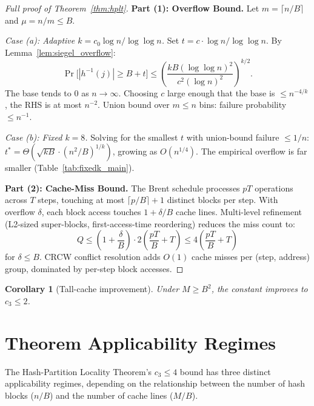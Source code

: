 \documentclass[11pt]{article}
\newtheorem{corollary}[theorem]{Corollary}
\begin{document}
\begin{proof}[Full proof of Theorem~\ref{thm:hplt}]
\textbf{Part (1): Overflow Bound.}
Let $m = \lceil n/B \rceil$ and $\mu = n/m \le B$.

\emph{Case (a): Adaptive $k = c_0 \log n / \log\log n$.}
Set $t = c \cdot \log n / \log\log n$.  By Lemma~\ref{lem:siegel_overflow}:
\[
  \Pr\bigl[|h^{-1}(j)| \ge B + t\bigr]
  \le \left(\frac{k B (\log\log n)^2}{c^2 (\log n)^2}\right)^{k/2}.
\]
The base tends to 0 as $n \to \infty$.  Choosing $c$ large enough that
the base is $\le n^{-4/k}$, the RHS is at most $n^{-2}$.  Union bound
over $m \le n$ bins: failure probability $\le n^{-1}$.

\emph{Case (b): Fixed $k = 8$.}
Solving for the smallest $t$ with union-bound failure $\le 1/n$:
$t^* = \Theta(\sqrt{kB} \cdot (n^2/B)^{1/k})$, growing as $O(n^{1/4})$.
The empirical overflow is far smaller (Table~\ref{tab:fixedk_main}).

\medskip
\textbf{Part (2): Cache-Miss Bound.}
The Brent schedule processes $pT$ operations across $T$ steps, touching
at most $\lceil p/B \rceil + 1$ distinct blocks per step.  With overflow
$\delta$, each block access touches $1 + \delta/B$ cache lines.
Multi-level refinement (L2-sized super-blocks, first-access-time
reordering) reduces the miss count to:
\[
  Q \le \left(1 + \frac{\delta}{B}\right) \cdot 2\left(\frac{pT}{B} + T\right)
  \le 4\left(\frac{pT}{B} + T\right)
\]
for $\delta \le B$.  CRCW conflict resolution adds $O(1)$ cache misses
per (step, address) group, dominated by per-step block accesses.
\end{proof}

\begin{corollary}[Tall-cache improvement]
Under $M \ge B^2$, the constant improves to $c_3 \le 2$.
\end{corollary}

\section{Theorem Applicability Regimes}
\label{app:regimes}

The Hash-Partition Locality Theorem's $c_3 \le 4$ bound has three
distinct applicability regimes, depending on the relationship between the
number of hash blocks ($n/B$) and the number of cache lines ($M/B$).
\end{document}
